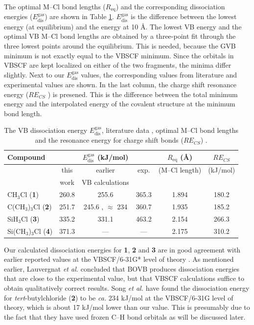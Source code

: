 The optimal M--Cl bond lengths ($R_\mathrm{eq}$) and the corresponding dissociation energies ($E_\mathrm{dis}^\mathrm{gas}$) are shown in Table \ref{ch3.tab.optimal}. $E_\mathrm{dis}^\mathrm{gas}$ is the difference between the lowest energy (at equilibrium) and the energy at 10 \AA. The lowest VB energy and the optimal VB M--Cl bond lengths are obtained by a three-point fit through the three lowest points around the equilibrium. This is needed, because the GVB minimum is not exactly equal to the VBSCF minimum. Since the orbitals in VBSCF are kept localized on either of the two fragments, the minima differ slightly. Next to our $E_\mathrm{dis}^\mathrm{gas}$ values, the corresponding values from literature and experimental values \cite{lauvergnat,psu} are shown. In the last column, the charge shift resonance energy ($RE_{CS}$ \cite{cs1}) is presened. This is the difference between the total minimum energy and the interpolated energy of the covalent structure at the minimum bond length. 
\begin{table}[hbtp]
\center
\caption{The VB dissociation energy $E_\mathrm{dis}^\mathrm{gas}$, literature data \cite{lauvergnat,song,psu}, optimal M--Cl bond lengths and the resonance energy for charge shift bonds ($RE_{CS}$) \cite{cs1}.}
\begin{tabular}{|l|c|c|c|c|c|}
\hline
Compound & \multicolumn{3}{c|}{$E_\mathrm{dis}^\mathrm{gas}$ (kJ/mol)} & $R_\mathrm{eq}$ (\AA) & $RE_{CS}$ \\
\hline
&\multicolumn{1}{c|}{this} & \multicolumn{1}{c|}{earlier} & \multicolumn{1}{c|}{exp.} & (M--Cl length) & (kJ/mol) \\
&\multicolumn{1}{c|}{work} & \multicolumn{1}{c|}{VB calculations} & \multicolumn{1}{c|}{} & & \\
\hline
CH$_3$Cl (\textbf{1})& 260.8 & 255.6 \cite{lauvergnat} & 365.3 \cite{lauvergnat} & 1.894 & 180.2\\
C(CH$_3$)$_3$Cl (\textbf{2}) & 251.7 & 245.6 \cite{psu}, $\approx$ 234 \cite{song} & 360.7 \cite{psu} & 1.935 & 185.2\\
SiH$_3$Cl (\textbf{3})& 335.2 & 331.1 \cite{lauvergnat} & 463.2 \cite{lauvergnat} & 2.154 & 266.3\\
Si(CH$_3$)$_3$Cl (\textbf{4}) & 371.3 & --- & --- & 2.175 & 310.2\\
\hline
\end{tabular}
\label{ch3.tab.optimal}
\end{table}
Our calculated dissociation energies for \textbf{1}, \textbf{2} and \textbf{3} are in good agreement with earlier reported values at the VBSCF/6-31G* level of theory \cite{lauvergnat, psu}. As mentioned earlier, Lauvergnat \textit{et al.} \cite{lauvergnat} concluded that BOVB produces dissociation energies that are close to the experimental value, but that VBSCF calculations suffice to obtain qualitatively correct results. Song \textit{et al.} \cite{song} have found the dissociation energy for \textit{tert}-butylchloride (\textbf{2}) to be \textit{ca.} 234 kJ/mol at the VBSCF/6-31G level of theory, which is about 17 kJ/mol lower than our value. This is presumably due to the fact that they have used frozen C--H bond orbitals as will be discussed later.


